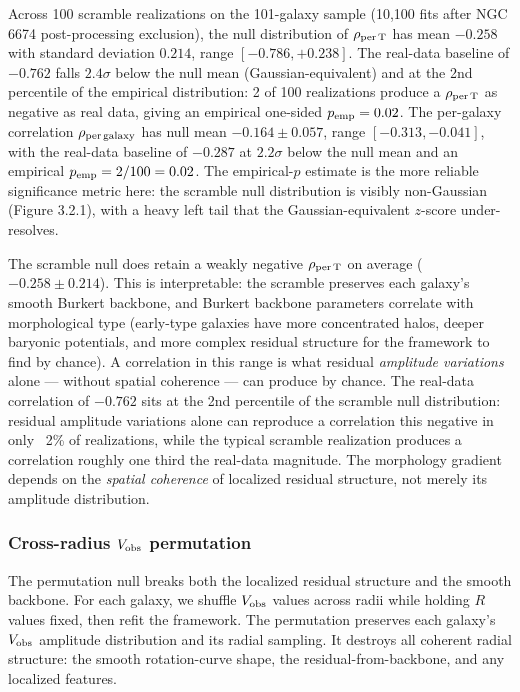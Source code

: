 \documentclass[linenumbers,trackchanges]{aastex701}
\begin{document}
Across 100 scramble realizations on the 101-galaxy sample (10,100 fits after NGC 6674 post-processing exclusion), the null distribution of $\rho_{\rm per\,T}$ has mean $-0.258$ with standard deviation $0.214$, range $[-0.786, +0.238]$. The real-data baseline of $-0.762$ falls $2.4\sigma$ below the null mean (Gaussian-equivalent) and at the 2nd percentile of the empirical distribution: 2 of 100 realizations produce a $\rho_{\rm per\,T}$ as negative as real data, giving an empirical one-sided $p_{\rm emp} = 0.02$. The per-galaxy correlation $\rho_{\rm per\,galaxy}$ has null mean $-0.164 \pm 0.057$, range $[-0.313, -0.041]$, with the real-data baseline of $-0.287$ at $2.2\sigma$ below the null mean and an empirical $p_{\rm emp} = 2/100 = 0.02$. The empirical-$p$ estimate is the more reliable significance metric here: the scramble null distribution is visibly non-Gaussian (Figure 3.2.1), with a heavy left tail that the Gaussian-equivalent $z$-score under-resolves.

The scramble null does retain a weakly negative $\rho_{\rm per\,T}$ on average ($-0.258 \pm 0.214$). This is interpretable: the scramble preserves each galaxy's smooth Burkert backbone, and Burkert backbone parameters correlate with morphological type (early-type galaxies have more concentrated halos, deeper baryonic potentials, and more complex residual structure for the framework to find by chance). A correlation in this range is what residual \emph{amplitude variations} alone --- without spatial coherence --- can produce by chance. The real-data correlation of $-0.762$ sits at the 2nd percentile of the scramble null distribution: residual amplitude variations alone can reproduce a correlation this negative in only ~2\% of realizations, while the typical scramble realization produces a correlation roughly one third the real-data magnitude. The morphology gradient depends on the \emph{spatial coherence} of localized residual structure, not merely its amplitude distribution.

\subsubsection{Cross-radius $V_{\rm obs}$ permutation}

The permutation null breaks both the localized residual structure and the smooth backbone. For each galaxy, we shuffle $V_{\rm obs}$ values across radii while holding $R$ values fixed, then refit the framework. The permutation preserves each galaxy's $V_{\rm obs}$ amplitude distribution and its radial sampling. It destroys all coherent radial structure: the smooth rotation-curve shape, the residual-from-backbone, and any localized features.
\end{document}
